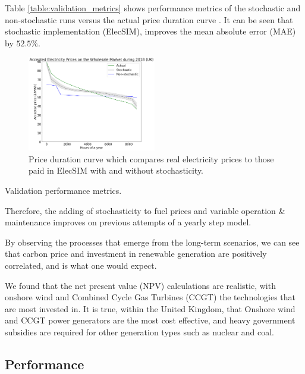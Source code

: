 Table \ref{table:validation_metrics} shows performance metrics of the stochastic and non-stochastic runs versus the actual price duration curve . It can be seen that stochastic implementation (ElecSIM), improves the mean absolute error (MAE) by $52.5\%$.

\begin{figure}
	\begin{center}
		\includegraphics[width=0.5\textwidth]{figures/load_price_duration_curve_comparison.pdf}
		\caption{Price duration curve which compares real electricity prices to those paid in ElecSIM with and without stochasticity.}
		\label{fig:price_duration_curve}
	\end{center}
\end{figure}

\begin{table}
	\centering
	\caption{Validation performance metrics.}
	\label{table:validation_metrics}
\end{table}

Therefore, the adding of stochasticity to fuel prices and variable operation \& maintenance improves on previous attempts of a yearly step model.

By observing the processes that emerge from the long-term scenarios, we can see that carbon price and investment in renewable generation are positively correlated, and is what one would expect.

We found that the net present value (NPV) calculations are realistic, with onshore wind and Combined Cycle Gas Turbines (CCGT) the technologies that are most invested in. It is true, within the United Kingdom, that Onshore wind and CCGT power generators are the most cost effective, and heavy government subsidies are required for other generation types such as nuclear and coal. 



\subsection{Performance}

